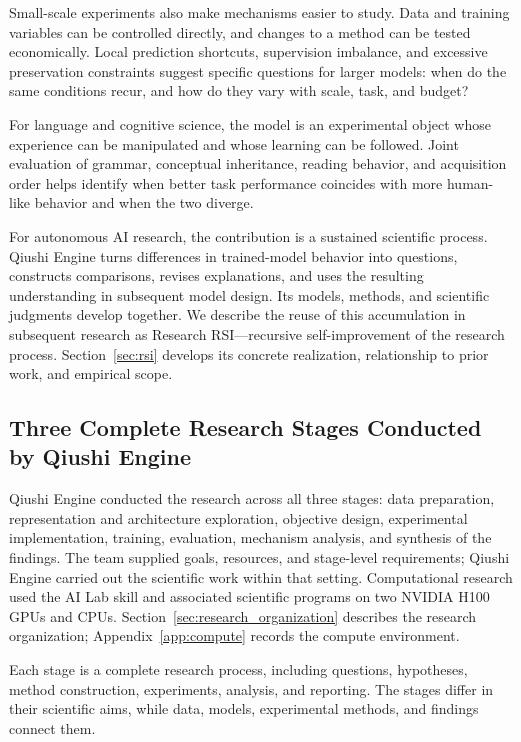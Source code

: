 Small-scale experiments also make mechanisms easier to study. Data and training variables can be controlled directly, and changes to a method can be tested economically. Local prediction shortcuts, supervision imbalance, and excessive preservation constraints suggest specific questions for larger models: when do the same conditions recur, and how do they vary with scale, task, and budget?

For language and cognitive science, the model is an experimental object whose experience can be manipulated and whose learning can be followed. Joint evaluation of grammar, conceptual inheritance, reading behavior, and acquisition order helps identify when better task performance coincides with more human-like behavior and when the two diverge.

For autonomous AI research, the contribution is a sustained scientific process. Qiushi Engine turns differences in trained-model behavior into questions, constructs comparisons, revises explanations, and uses the resulting understanding in subsequent model design. Its models, methods, and scientific judgments develop together. We describe the reuse of this accumulation in subsequent research as Research RSI---recursive self-improvement of the research process. Section~\ref{sec:rsi} develops its concrete realization, relationship to prior work, and empirical scope.

\subsection{Three Complete Research Stages Conducted by Qiushi Engine}

Qiushi Engine conducted the research across all three stages: data preparation, representation and architecture exploration, objective design, experimental implementation, training, evaluation, mechanism analysis, and synthesis of the findings. The team supplied goals, resources, and stage-level requirements; Qiushi Engine carried out the scientific work within that setting. Computational research used the AI Lab skill and associated scientific programs on two NVIDIA H100 GPUs and CPUs. Section~\ref{sec:research_organization} describes the research organization; Appendix~\ref{app:compute} records the compute environment.

Each stage is a complete research process, including questions, hypotheses, method construction, experiments, analysis, and reporting. The stages differ in their scientific aims, while data, models, experimental methods, and findings connect them.

